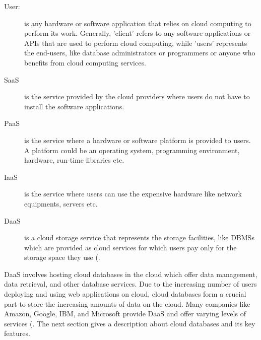 \begin{description}

	\item [User:] is any hardware or software application that relies on cloud
	computing to perform its work.  Generally,   'client' refers to any software applications or
	\acp{API}  that are used to perform cloud computing,  
	while 'users' represents the end-users,   like  database administrators or
	programmers or anyone who benefits from cloud computing services. 
	
	\item [\acf{SaaS}] is the service provided by the cloud
	providers where users do not have to install the software applications. 
	
	\item [\acf{PaaS}] is the service where a hardware or
	software platform is provided to users.  A platform could be an operating system,  
	programming environment,   hardware,   run-time libraries etc. 
	
	\item [\acf{IaaS}] is the service where users can use
	the expensive hardware like network equipments,   servers etc. 
	
	\item [\acf{DaaS}] is a cloud storage service  that represents
	the storage facilities,   like  \acp{DBMS} which are provided
	as cloud services for which users pay only for the storage space they use
	(. 

\end{description}


\ac{DaaS} involves hosting cloud databases in the cloud which offer data
management,   data retrieval,   and other database services.  Due to the
increasing number of users deploying and using web applications on cloud,  
cloud databases form a crucial part to store the increasing amounts of data
on the cloud.  Many companies like Amazon,   Google,   IBM,   and Microsoft
provide \ac{DaaS} and offer varying levels of services (. The next section gives a description about cloud databases and its key
features.
